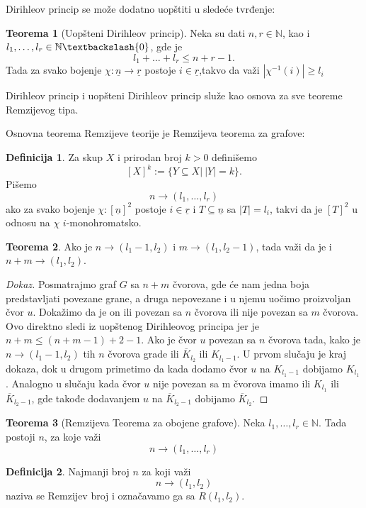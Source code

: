 \documentclass{article}
\theoremstyle{definition}
\newtheorem{definicija}{Definicija}[section]
\newtheorem{teorema}{Teorema}[section]
\newcommand{\dokaz}[1]{\begin{proof}[Dokaz]#1\end{proof}}
\begin{document}
	
	Dirihleov princip se može dodatno uopštiti u sledeće tvrđenje:
	\begin{teorema}[Uopšteni Dirihleov princip]
		Neka su dati $n,r \in \mathbb{N}$, kao i $l_1,\ldots,l_r \in \mathbb{N}\textbackslash\{0\}$, gde je
		\[
		l_1+\ldots+l_r\leq n+r-1.
		\]
		Tada za svako bojenje $\chi:\underline{n}\rightarrow\underline{r}$ postoje $i\in \underline{r}$,takvo da važi $|\chi^{-1}(i)|\geq l_i$
	\end{teorema}
	
	Dirihleov princip i uopšteni Dirihleov princip služe kao osnova za sve teoreme Remzijevog tipa.
	
	Osnovna teorema Remzijeve teorije je Remzijeva teorema za grafove:
	
	\begin{definicija}
		Za skup $X$ i prirodan broj $k>0$ definišemo
		\[
		[X]^k :=\{Y\subseteq X | \:|Y|=k\}.
		\]
		Pišemo
		\[
		n\rightarrow (l_1,\ldots,l_r)
		\]
		ako za svako bojenje $\chi:[\underline{n}]^2$ postoje $i\in \underline{r}$ i $T\subseteq \underline{n}$ sa $|T|=l_i$, takvi da je $[T]^2$ u odnosu na $\chi$ $i$-monohromatsko.	
	\end{definicija}
	\begin{teorema}
	Ako je $n \rightarrow (l_1 - 1, l_2)$ i $m \rightarrow (l_1, l_2 - 1)$, tada važi da je i $n + m \rightarrow (l_1,l_2)$.
	\dokaz{
		Posmatrajmo graf $G$ sa $n + m$ čvorova, gde će nam jedna boja predstavljati povezane grane, a druga nepovezane i u njemu uočimo 					proizvoljan čvor $u$. Dokažimo da je on ili povezan sa $n$ čvorova ili nije povezan sa $m$ čvorova.  Ovo direktno sledi iz uopštenog Dirihleovog 				principa jer je $n + m \leq (n + m - 1) + 2 - 1$. Ako je čvor $u$ povezan sa $n$ čvorova tada, kako je $n \rightarrow (l_1 - 1, l_2)$ tih $n$ 				čvorova grade ili $\overline K_{l_2}$ ili $K_{l_1 - 1}$. U prvom slučaju je kraj dokaza, dok u drugom primetimo da kada dodamo čvor $u$ na 
		$K_{l_1 - 1}$ dobijamo $K_{l_1}$. Analogno u slučaju kada čvor $u$ nije povezan sa m čvorova imamo ili $K_{l_1}$ ili $\overline K_{l_2 - 1}$, 				gde takođe dodavanjem $u$ na $\overline K_{l_2 - 1}$ dobijamo $\overline K_{l_2}$.
	}
	\end{teorema}
	\begin{teorema}[Remzijeva Teorema za obojene grafove]\label{remziViseBoja}
		Neka $l_1,\ldots, l_r \in \mathbb{N}$. Tada postoji $n$, za koje važi
		\[
		n\rightarrow(l_1,\ldots,l_r)
		\]
	\end{teorema}
	
	\begin{definicija}
		Najmanji broj $n$ za koji važi
		\[
		n\rightarrow(l_1,l_2)
		\]
		naziva se Remzijev broj i označavamo ga sa $R(l_1,l_2)$.
	\end{definicija}
	
\end{document}
